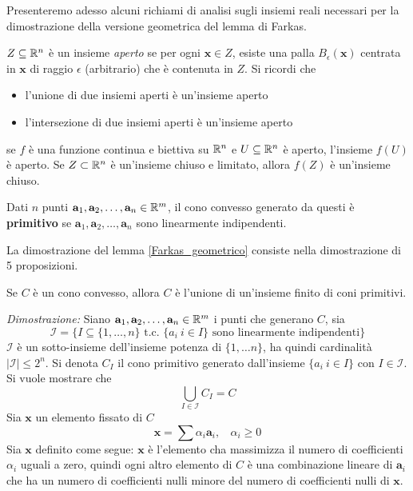 \documentclass[10pt, letterpaper]{report}
\newcommand{\x}{{\mathbf{x}}}
\begin{document}
Presenteremo adesso alcuni richiami di analisi sugli insiemi reali necessari per la dimostrazione della versione geometrica del lemma di Farkas.\bigskip 

$Z\subseteq {\mathbb R}^n$ è un insieme \textit{aperto} se per ogni $\x\in Z$, esiste una palla $B_\epsilon(\x)$ centrata in $\x$ di raggio $\epsilon$ (arbitrario) che è contenuta in $Z$. Si ricordi che \begin{itemize}
    \item l'unione di due insiemi aperti è un'insieme aperto  
    \item l'intersezione di due insiemi aperti è un'insieme aperto  
\end{itemize}

\begin{lemma2}\label{fatto}
    se $f$ è una funzione continua e biettiva su ${\mathbb R}^n$ e $U\subseteq {\mathbb R}^n$ è aperto, l'insieme $f(U)$ è aperto. Se $Z\subset {\mathbb R}^n$ è un'insieme chiuso e limitato, allora $f(Z)$ è un'insieme chiuso.  
\end{lemma2}
\begin{definizione}
    Dati $n$ punti $\mathbf a_1,\mathbf a_2,\dots, \mathbf a_n \in {\mathbb R}^m$, il cono convesso generato da questi è \textbf{primitivo} se $\mathbf a_1,\mathbf a_2,\dots, \mathbf a_n$ sono linearmente indipendenti.
\end{definizione}

La dimostrazione del lemma \ref{Farkas_geometrico} consiste nella dimostrazione di 5 proposizioni.
\begin{proposizione}\label{farkas_punto1}
    Se $C$ è un cono convesso, allora $C$ è l'unione di un'insieme finito di coni primitivi.
\end{proposizione}
\textit{Dimostrazione:} Siano  $\mathbf a_1,\mathbf a_2,\dots, \mathbf a_n \in {\mathbb R}^m$ i punti che generano $C$, sia 
$$ \mathcal I = \{ I\subseteq \{1,\dots,n\} \text{ t.c. } \{a_i \ i\in I\} \text{ sono linearmente indipendenti}\}$$
$\mathcal I$ è un sotto-insieme dell'insieme potenza di $\{1,\dots n\}$, ha quindi cardinalità $|\mathcal I|\le 2^n$. Si denota $C_I$ il cono primitivo generato dall'insieme $\{a_i \ i\in I\}$ con $I\in\mathcal I$. Si vuole mostrare che 
$$ 
\bigcup_{I\in\mathcal I}C_I=C
$$
Sia $\x$ un elemento fissato di $C$
$$ \x=\sum \alpha_i\mathbf a_i, \ \ \ \ \alpha_i\ge 0$$
Sia $\x$ definito come segue: $\x$ è l'elemento cha massimizza il numero di coefficienti $\alpha_i$ uguali a zero, quindi ogni altro elemento di $C$ è una combinazione lineare di $\mathbf a_i$ che ha un numero di  coefficienti nulli minore del numero di coefficienti nulli di $\x$.
\end{document}
